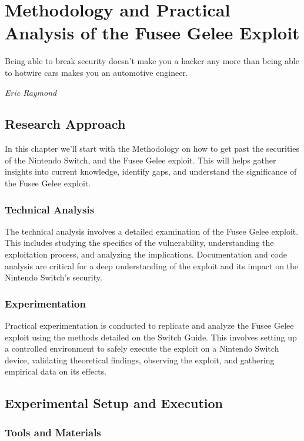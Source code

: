 \chapter{Methodology and Practical Analysis of the Fusee Gelee Exploit}
\epigraph{Being able to break security doesn't make you a hacker any more than being able to hotwire cars makes you an automotive engineer.}{\textit{Eric Raymond}}

\section{Research Approach}

In this chapter we'll start with the Methodology on how to get past the securities of the Nintendo Switch, and the Fusee Gelee exploit. This will helps gather insights into current knowledge, identify gaps, and understand the significance of the Fusee Gelee exploit.

\subsection{Technical Analysis}

The technical analysis involves a detailed examination of the Fusee Gelee exploit. This includes studying the specifics of the vulnerability, understanding the exploitation process, and analyzing the implications. Documentation and code analysis are critical for a deep understanding of the exploit and its impact on the Nintendo Switch's security.

\subsection{Experimentation}

Practical experimentation is conducted to replicate and analyze the Fusee Gelee exploit using the methods detailed on the Switch Guide. This involves setting up a controlled environment to safely execute the exploit on a Nintendo Switch device, validating theoretical findings, observing the exploit, and gathering empirical data on its effects.

\section{Experimental Setup and Execution}

\subsection{Tools and Materials}

